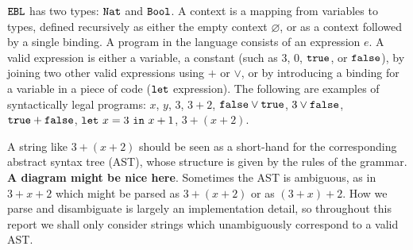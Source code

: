 $\mathtt{EBL}$ has two types: $\mathtt{Nat}$ and $\mathtt{Bool}$. A context is a mapping from variables to types, defined recursively as either the empty context $\varnothing$, or as a context followed by a single binding. A program in the language consists of an expression $e$. A valid expression is either a variable, a constant (such as $3$, $0$, $\mathtt{true}$, or $\mathtt{false}$), by joining two other valid expressions using $+$ or $\lor$, or by introducing a binding for a variable in a piece of code ($\mathtt{let}$ expression). The following are examples of syntactically legal programs: $x$, $y$, $3$, $3+2$, $\mathtt{false} \lor \mathtt{true}$, $3 \lor \mathtt{false}$, $\mathtt{true} + \mathtt{false}$, $\mathtt{let}~ x = 3~\mathtt{in}~ x+1$, $3+(x+2)$.

A string like $3 + (x + 2)$ should be seen as a short-hand for the corresponding abstract syntax tree (AST), whose structure is given by the rules of the grammar. \textbf{A diagram might be nice here}. Sometimes the AST is ambiguous, as in $3 + x + 2$ which might be parsed as $3 + (x + 2)$ or as $(3 + x) + 2$. How we parse and disambiguate is largely an implementation detail, so throughout this report we shall only consider strings which unambiguously correspond to a valid AST.\\

